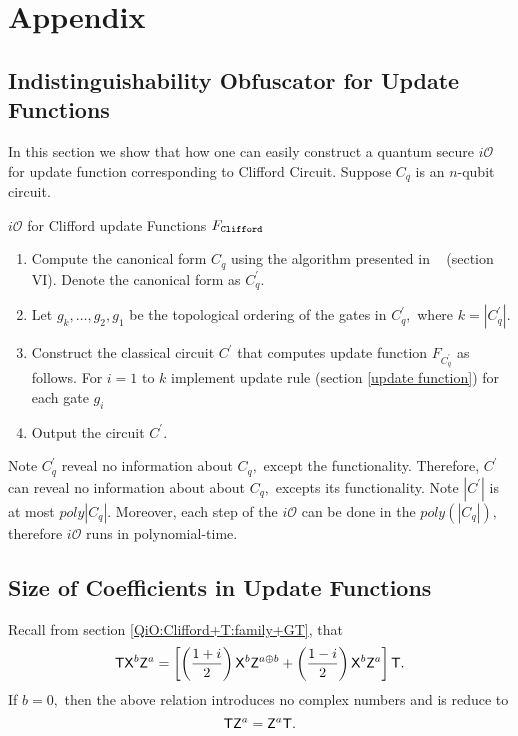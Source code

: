 \section{Appendix} 
 \subsection{Indistinguishability Obfuscator for Update Functions}
 \label{sec: iO-clifford-functions}
 In this section we show that how one can easily construct a quantum secure $i\mathcal{O}$ for update function corresponding to Clifford Circuit. Suppose $C_q$ is an $n$-qubit circuit.
\begin{algorithm}[H]
  \caption{$i\mathcal{O}$ for Clifford update Functions $F_{\tt Clifford}$}
  \begin{enumerate}
  \item Compute the canonical form $C_q$ using the algorithm presented in ~\cite{AG04} (section VI). Denote the canonical form as $C_q^\prime.$
  \item Let $g_k, \ldots,g_2,g_1$ be the topological ordering of the gates in $C_q^\prime,$ where $k=|C_q^\prime|.$
  \item Construct the classical circuit $C^\prime$ that computes update function $F_{C_q^\prime}$ as follows. For $i=1$ to $k$ implement update rule (section \ref{update function})  for each gate $g_i$
  \item Output the circuit $C^\prime.$
  \end{enumerate}
\end{algorithm}
%
\noindent Note $C_q^\prime$ reveal no information about $C_q,$ except the functionality. Therefore, $C^\prime$ can reveal no information about about $C_q,$ excepts its functionality. Note $|C^\prime|$ is at most $poly|C_q|.$ Moreover, each step of the $i\mathcal{O}$ can be done in the $poly(|C_q|),$ therefore $i\mathcal{O}$ runs in polynomial-time.



 \subsection{Size of Coefficients in Update Functions}
 \label{coeff:size}
 Recall from section \ref{QiO:Clifford+T:family+GT}, that
 \begin{equation}
  \label{eq1:1qubit-size}
\begin{aligned}
{\sf T} {\sf X}^b {\sf Z}^a=\left[\left(\frac{1+i}{2}\right) {\sf X}^b {\sf Z}^{a\oplus b} + \left(\frac{1-i}{2}\right){\sf X}^b {\sf Z}^a\right] {\sf T}. \\
\end{aligned}
\end{equation}
If $b=0,$ then the above relation introduces no complex numbers and is reduce to
\begin{equation*}
{\sf T} {\sf Z}^a=  {\sf Z}^{a} {\sf T}. 
\end{equation*}
 

